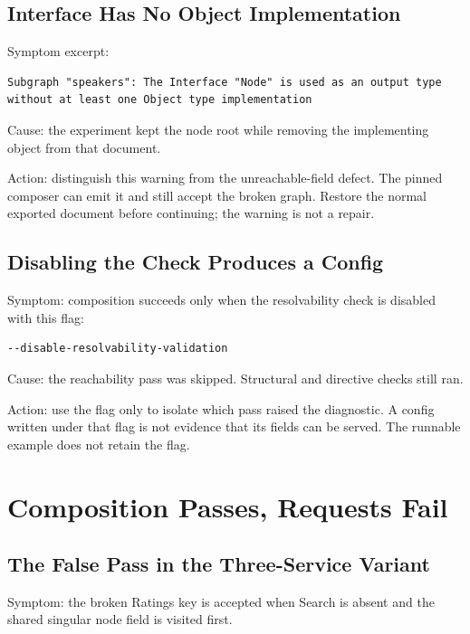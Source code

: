 \subsection*{Interface Has No Object Implementation}

Symptom excerpt:

\begin{verbatim}
Subgraph "speakers": The Interface "Node" is used as an output type without at least one Object type implementation
\end{verbatim}

Cause: the experiment kept the node root while removing the implementing
object from that document.

Action: distinguish this warning from the unreachable-field defect.
The pinned composer can emit it and still accept the broken graph.
Restore the normal exported document before continuing; the warning is not
a repair.

\subsection*{Disabling the Check Produces a Config}

Symptom: composition succeeds only when the resolvability check is disabled
with this flag:

\begin{verbatim}
--disable-resolvability-validation
\end{verbatim}

Cause: the reachability pass was skipped. Structural and directive checks
still ran.

Action: use the flag only to isolate which pass raised the diagnostic.
A config written under that flag is not evidence that its fields can be
served. The runnable example does not retain the flag.

\section{Composition Passes, Requests Fail}

\subsection*{The False Pass in the Three-Service Variant}

Symptom: the broken Ratings key is accepted when Search is absent and the
shared singular node field is visited first.

